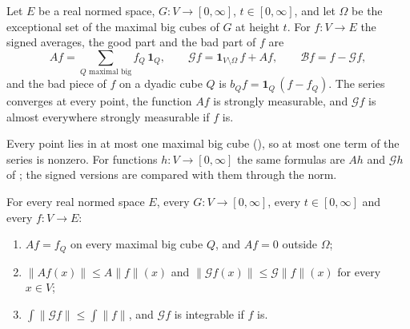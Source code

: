 \begin{definition}
\label{def:calderon-zygmund-signed}
\leanok
{}
Let $E$ be a real normed space, $G : V \to [0, \infty]$, $t \in [0, \infty]$, and let $\Omega$
be the exceptional set of the maximal big cubes of $G$ at height $t$. For $f : V \to E$ the
signed averages, the good part and the bad part of $f$ are
\[
  A f = \sum_{Q \text{ maximal big}} f_Q \, \mathbf 1_Q ,
  \qquad
  \mathcal G f = \mathbf 1_{V \setminus \Omega} \, f + A f ,
  \qquad
  \mathcal B f = f - \mathcal G f ,
\]
and the bad piece of $f$ on a dyadic cube $Q$ is $b_Q f = \mathbf 1_Q \, (f - f_Q)$. The
series converges at every point, the function $A f$ is strongly measurable, and $\mathcal G f$
is almost everywhere strongly measurable if $f$ is.
\end{definition}

Every point lies in at most one maximal big cube (), so at most one
term of the series is nonzero. For functions $h : V \to [0, \infty]$ the same formulas are
$A h$ and $\mathcal G h$ of ; the signed versions are
compared with them through the norm.

\begin{lemma}
\label{lem:calderon-zygmund-signed-good}
\leanok
{}
For every real normed space $E$, every $G : V \to [0, \infty]$, every $t \in [0, \infty]$ and
every $f : V \to E$:
\begin{enumerate}
  \item $A f = f_Q$ on every maximal big cube $Q$, and $A f = 0$ outside $\Omega$;
  \item $\|A f(x)\| \leq A \|f\|(x)$ and $\|\mathcal G f(x)\| \leq \mathcal G \|f\|(x)$ for
    every $x \in V$;
  \item $\int \|\mathcal G f\| \leq \int \|f\|$, and $\mathcal G f$ is integrable if $f$ is.
\end{enumerate}
\end{lemma}

